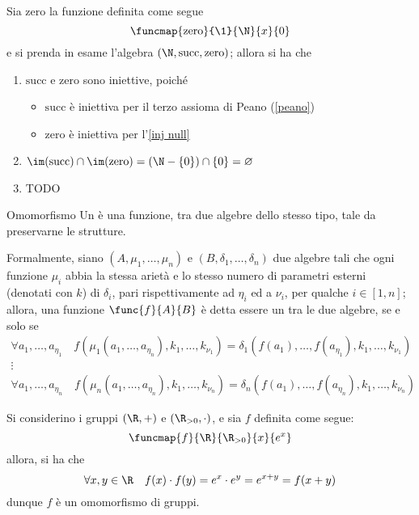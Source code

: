 \documentclass[a4paper, 12pt]{report}
\begin{document}
    \begin{example}
        Sia $\mathrm{zero}$ la funzione definita come segue $$\funcmap{\mathrm{zero}}{\1}{\N}{x}{0}$$ e si prenda in esame l'algebra $(\N, \mathrm{succ}, \mathrm{zero})$; allora si ha che

        \begin{enumerate}[label=\roman*), font=\itshape]
            \item $\mathrm{succ}$ e $\mathrm{zero}$ sono iniettive, poiché
                \begin{itemize}
                    \item $\mathrm{succ}$ è iniettiva per il terzo assioma di Peano (\cref{peano})
                    \item $\mathrm{zero}$ è iniettiva per l'\cref{inj null}
                \end{itemize}
            \item $\im(\mathrm{succ}) \cap \im(\mathrm{zero}) = \left(\N - \{0\}\right) \cap \{0\} = \varnothing$
            \item TODO
        \end{enumerate}
    \end{example}

    \begin{frameddefn}{Omomorfismo}
        Un  è una funzione, tra due algebre dello stesso tipo, tale da preservarne le strutture.

        Formalmente, siano $(A, \mu_1, \ldots, \mu_n)$ e $(B, \delta_1, \ldots, \delta_n)$ due algebre tali che ogni funzione $\mu_i$ abbia la stessa arietà e lo stesso numero di parametri esterni (denotati con $k$) di $\delta_i$, pari rispettivamente ad $\eta_i$ ed a $\nu_i$, per qualche $i \in [1, n]$; allora, una funzione $\func{f}{A}{B}$ è detta essere un  tra le due algebre, se e solo se $$\begin{array}{c} \forall a_1, \ldots, a_{\eta_1} \quad f(\mu_1(a_1, \ldots, a_{\eta_n}), k_1, \ldots, k_{\nu_1}) = \delta_1(f(a_1), \ldots, f(a_{\eta_1}), k_1, \ldots, k_{\nu_1}) \\ \vdots \\ \forall a_1, \ldots, a_{\eta_n} \quad f(\mu_n(a_1, \ldots, a_{\eta_n}), k_1, \ldots, k_{\nu_n}) = \delta_n(f(a_1), \ldots, f(a_{\eta_n}), k_1, \ldots, k_{\nu_n}) \end{array}$$
    \end{frameddefn}

    \begin{example}[Omomorfismi]
        \label{homo}
        Si considerino i gruppi $(\R, +)$ e $(\R_{> 0}, \cdot)$, e sia $f$ definita come segue: $$\funcmap{f}{\R}{\R_{> 0}}{x}{e^x}$$ allora, si ha che $$\forall x, y \in \R \quad f(x) \cdot f(y) = e^x \cdot e^y = e^{x + y} = f(x + y)$$ dunque $f$ è un omomorfismo di gruppi.
    \end{example}
\end{document}
